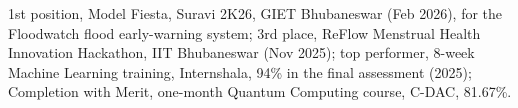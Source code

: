 
1st position, Model Fiesta, Suravi 2K26, GIET Bhubaneswar (Feb 2026), for the Floodwatch flood early-warning system; 3rd place, ReFlow Menstrual Health Innovation Hackathon, IIT Bhubaneswar (Nov 2025); top performer, 8-week Machine Learning training, Internshala, 94\% in the final assessment (2025); Completion with Merit, one-month Quantum Computing course, C-DAC, 81.67\%.
